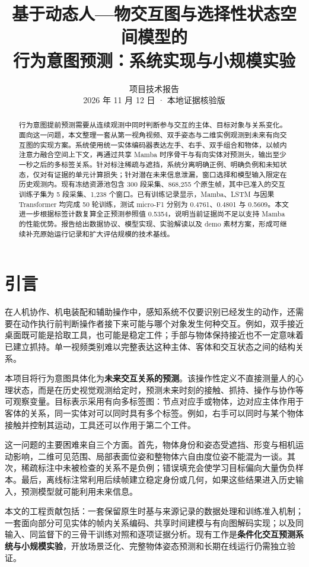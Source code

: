 \documentclass[10pt,twocolumn,letterpaper]{article}
\title{基于动态人—物交互图与选择性状态空间模型的\\行为意图预测：系统实现与小规模实验}
\author{项目技术报告\\2026 年 11 月 12 日 · 本地证据核验版}
\begin{document}
\maketitle

\begin{abstract}
行为意图提前预测需要从连续观测中同时判断参与交互的主体、目标对象与关系变化。面向这一问题，本文整理一套从第一视角视频、双手姿态与二维实例观测到未来有向交互图的实现方案。系统使用统一实体编码器表达左手、右手、双手组合和物体，以帧内注意力融合空间上下文，再通过共享 Mamba 时序骨干与有向实体对预测头，输出至少一秒之后的多标签关系。针对标注稀疏与遮挡，系统分离明确正例、明确负例和未知状态，仅对有证据的单元计算损失；针对潜在未来信息泄漏，窗口选择和模型输入限定在历史观测内。现有冻结资源池包含 300 段采集、868,255 个原生帧，其中已准入的交互训练子集为 5 段采集、1,238 个窗口。已有训练记录显示，Mamba、LSTM 与因果 Transformer 均完成 50 轮训练，测试 micro-F1 分别为 0.4761、0.4801 与 0.5609。本文进一步根据标签计数复算全正预测参照值 0.5354，说明当前证据尚不足以支持 Mamba 的性能优势。报告给出数据协议、模型实现、实验解读以及 demo 素材方案，形成可继续补充原始运行记录和扩大评估规模的技术基线。
\end{abstract}

\section{引言}
在人机协作、机电装配和辅助操作中，感知系统不仅要识别已经发生的动作，还需要在动作执行前判断操作者接下来可能与哪个对象发生何种交互。例如，双手接近桌面既可能是拾取工具，也可能是稳定工件；手部与物体保持接近也不一定意味着已建立抓持。单一视频类别难以完整表达这种主体、客体和交互状态之间的结构关系。

本项目将行为意图具体化为\textbf{未来交互关系的预测}。该操作性定义不直接测量人的心理状态，而是在历史视觉观测给定时，预测未来时刻的接触、抓持、操作与协作等可观察变量。目标表示采用有向多标签图：节点对应手或物体，边对应主体作用于客体的关系，同一实体对可以同时具有多个标签。例如，右手可以同时与某个物体接触并控制其运动，工具还可以作用于第二个工件。

这一问题的主要困难来自三个方面。首先，物体身份和姿态受遮挡、形变与相机运动影响，二维可见范围、局部表面位姿和整物体六自由度位姿不能混为一谈。其次，稀疏标注中未被检查的关系不是负例；错误填充会使学习目标偏向大量伪负样本。最后，离线标注常利用后续帧建立稳定身份或几何，如果这些结果进入历史输入，预测模型就可能利用未来信息。

本文的工程贡献包括：一套保留原生时基与来源记录的数据处理和训练准入机制；一套面向部分可见实体的帧内关系编码、共享时间建模与有向图解码实现；以及同输入、同监督下的三骨干训练对照和逐项证据分析。现有工作是\textbf{条件化交互预测系统与小规模实验}，开放场景泛化、完整物体姿态预测和长期在线运行仍需独立验证。
\end{document}
